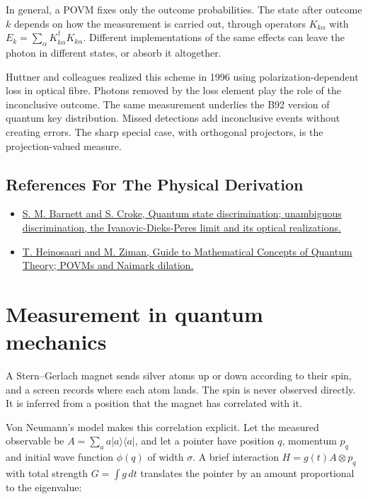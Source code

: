 \documentclass[11pt,oneside]{book}
\begin{document}
In general, a POVM fixes only the outcome probabilities. The state after outcome \(k\) depends on how the measurement is carried out, through operators \(K_{k\alpha}\) with \(E_k=\sum_\alpha K_{k\alpha}^\dagger K_{k\alpha}\). Different implementations of the same effects can leave the photon in different states, or absorb it altogether.

Huttner and colleagues realized this scheme in 1996 using polarization-dependent loss in optical fibre. Photons removed by the loss element play the role of the inconclusive outcome. The same measurement underlies the B92 version of quantum key distribution. Missed detections add inconclusive events without creating errors. The sharp special case, with orthogonal projectors, is the projection-valued measure.

\subsection*{References For The Physical Derivation}
\begin{itemize}
\item \href{https://arxiv.org/abs/0810.1970}{S. M. Barnett and S. Croke, Quantum state discrimination; unambiguous discrimination, the Ivanovic-Dieks-Peres limit and its optical realizations.}
\item \href{https://arxiv.org/abs/0810.3536}{T. Heinosaari and M. Ziman, Guide to Mathematical Concepts of Quantum Theory; POVMs and Naimark dilation.}
\end{itemize}





\clearpage

\section{Measurement in quantum mechanics}

\label{topic:measurement-in-quantum-mechanics}

A Stern--Gerlach magnet sends silver atoms up or down according to their spin, and a screen records where each atom lands. The spin is never observed directly. It is inferred from a position that the magnet has correlated with it.

Von Neumann's model makes this correlation explicit. Let the measured observable be \(A=\sum_aa|a\rangle\langle a|\), and let a pointer have position \(q\), momentum \(p_q\) and initial wave function \(\phi(q)\) of width \(\sigma\). A brief interaction \(H=g(t)A\otimes p_q\) with total strength \(G=\int g\,dt\) translates the pointer by an amount proportional to the eigenvalue:
\end{document}
